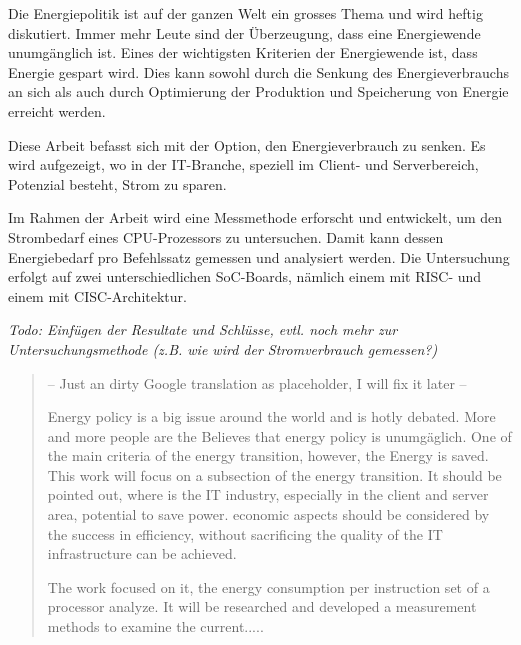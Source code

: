 \begin{zusammenfassung}

Die Energiepolitik ist auf der ganzen Welt ein grosses Thema und wird heftig diskutiert. Immer mehr Leute sind der Überzeugung, dass eine Energiewende unumgänglich ist. Eines der wichtigsten Kriterien der Energiewende ist, dass Energie gespart wird. Dies kann sowohl durch die Senkung des Energieverbrauchs an sich als auch durch Optimierung der Produktion und Speicherung von Energie erreicht werden.
\par
Diese Arbeit befasst sich mit der Option, den Energieverbrauch zu senken. Es wird aufgezeigt, wo in der IT-Branche, speziell im Client- und Serverbereich, Potenzial besteht, Strom zu sparen.
\par
Im Rahmen der Arbeit wird eine Messmethode erforscht und entwickelt, um den Strombedarf eines CPU-Prozessors zu untersuchen. Damit kann dessen Energiebedarf pro Befehlssatz gemessen und analysiert werden. Die Untersuchung erfolgt auf zwei unterschiedlichen SoC-Boards, nämlich einem mit RISC- und einem mit CISC-Architektur.

\textit{Todo: Einfügen der Resultate und Schlüsse, evtl. noch mehr zur Untersuchungsmethode (z.B. wie wird der Stromverbrauch gemessen?)}


\end{zusammenfassung}

\begin{abstract} 

-- Just an dirty Google translation as placeholder, I will fix it later --
\par
Energy policy is a big issue around the world and is hotly debated. More and more people are the
Believes that energy policy is unumgäglich. One of the main criteria of the energy transition, however, the
Energy is saved. This work will focus on a subsection of the energy transition. It should be pointed out,
where is the IT industry, especially in the client and server area, potential to save power. economic aspects
should be considered by the success in efficiency, without sacrificing the quality of the IT infrastructure
can be achieved.
\par
The work focused on it, the energy consumption per instruction set of a processor
analyze. It will be researched and developed a measurement methods to examine the current.....

\end{abstract}
